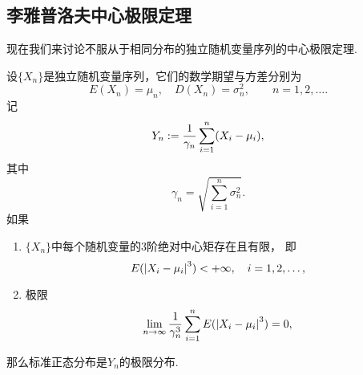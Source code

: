 \subsection{李雅普洛夫中心极限定理}
现在我们来讨论不服从于相同分布的独立随机变量序列的中心极限定理.

\begin{theorem}[李雅普洛夫中心极限定理]
设\(\{X_n\}\)是独立随机变量序列，它们的数学期望与方差分别为\[
	E(X_n) = \mu_n, \quad
	D(X_n) = \sigma_n^2,
	\qquad n=1,2,\dotsc.
\]
记\[
	Y_n := \frac{1}{\gamma_n} \sum_{i=1}^n (X_i-\mu_i),
\]
其中\[
	\gamma_n = \sqrt{\sum_{i=1}^n \sigma_n^2}.
\]
如果\begin{enumerate}
	\item \(\{X_n\}\)中每个随机变量的3阶绝对中心矩存在且有限，
	即\[
		E(\abs{X_i-\mu_i}^3) < +\infty,
		\quad i=1,2,\dotsc,
	\]

	\item 极限\[
		\lim_{n\to\infty} \frac{1}{\gamma_n^3}
			\sum_{i=1}^n E(\abs{X_i-\mu_i}^3)
		= 0,
	\]
\end{enumerate}
那么标准正态分布是\(Y_n\)的极限分布.
\end{theorem}

